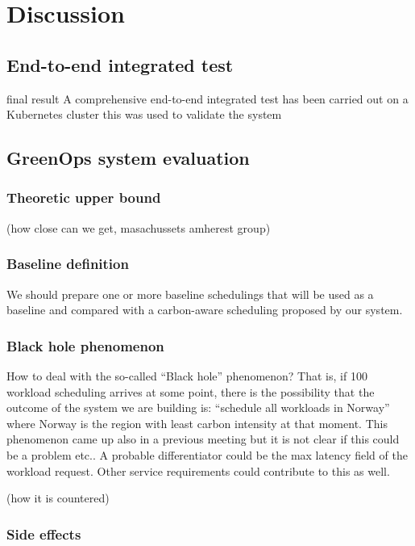 \chapter{Discussion}
\label{cha:discussion}

\section{End-to-end integrated test}

final result
A comprehensive end-to-end integrated test has been carried out on a Kubernetes cluster
this was used to validate the system

\section{GreenOps system evaluation}

\subsection{Theoretic upper bound}

 (how close can we get, masachussets amherest group)

\subsection{Baseline definition}

We should prepare one or more baseline schedulings that will be used as a baseline and compared with a carbon-aware scheduling proposed by our system.

\subsection{Black hole phenomenon}

How to deal with the so-called “Black hole” phenomenon?
That is, if 100 workload scheduling arrives at some point, there is the possibility that the outcome of the system we are building is: “schedule all workloads in Norway” where Norway is the region with least carbon intensity at that moment.
This phenomenon came up also in a previous meeting but it is not clear if this could be a problem etc..
A probable differentiator could be the max latency field of the workload request. Other service requirements could contribute to this as well.


(how it is countered)

\subsection{Side effects}

